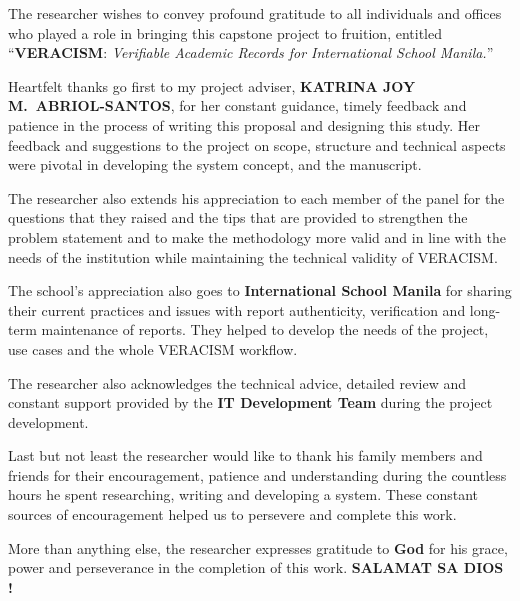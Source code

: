 
\begin{acknowledgement}
The researcher wishes to convey profound gratitude to all individuals and
offices who played a role in bringing this capstone project to fruition,
entitled “\textbf{VERACISM}: \textit{Verifiable Academic Records for International School
Manila.}”

Heartfelt thanks go first to my project adviser, \textbf{KATRINA JOY M.\ ABRIOL-SANTOS}, for her constant guidance, timely feedback and patience in the process of writing this proposal and designing this study. Her feedback and suggestions to the project on scope, structure and technical aspects were pivotal in developing the system concept, and the manuscript.

The researcher also extends his appreciation to each member of the panel for the questions that they raised and the tips that are provided to strengthen the problem statement and to make the methodology more valid and in line with the needs of the institution while maintaining the technical validity of VERACISM. 

The school's appreciation also goes to \textbf{International School Manila} for sharing their current practices and issues with report authenticity, verification and long-term maintenance of reports. They helped to develop the needs of the project, use cases and the whole VERACISM workflow. 

The researcher also acknowledges the technical advice, detailed review and constant support provided by the \textbf{IT Development Team} during the project development. 

Last but not least the researcher would like to thank his family members and friends for their encouragement, patience and understanding during the countless hours he spent researching, writing and developing a system. These constant sources of encouragement helped us to persevere and complete this work. 

More than anything else, the researcher expresses gratitude to \textbf{God} for his grace, power and perseverance in the completion of this work. \textbf{SALAMAT SA DIOS !} 

\end{acknowledgement}
